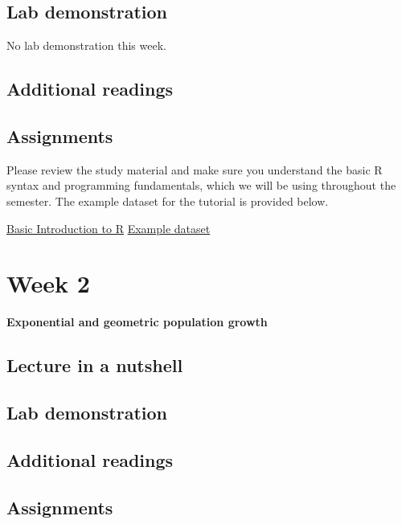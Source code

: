 \documentclass[
]{book}
\begin{document}
\hypertarget{lab-demonstration}{%
\section*{Lab demonstration}\label{lab-demonstration}}

No lab demonstration this week.

\hypertarget{additional-readings}{%
\section*{Additional readings}\label{additional-readings}}

\hypertarget{assignments}{%
\section*{Assignments}\label{assignments}}

Please review the study material and make sure you understand the basic R syntax and programming fundamentals, which we will be using throughout the semester. The example dataset for the tutorial is provided below.

\href{./Assignments/Week1_Basic\%20Introduction\%20to\%20R.pdf}{Basic Introduction to R}
\href{./Assignments/example_dat.txt}{Example dataset}

\hypertarget{week-2}{%
\chapter*{Week 2}\label{week-2}}

\textbf{Exponential and geometric population growth}

\hypertarget{lecture-in-a-nutshell-1}{%
\section*{Lecture in a nutshell}\label{lecture-in-a-nutshell-1}}

\hypertarget{lab-demonstration-1}{%
\section*{Lab demonstration}\label{lab-demonstration-1}}

\hypertarget{additional-readings-1}{%
\section*{Additional readings}\label{additional-readings-1}}

\hypertarget{assignments-1}{%
\section*{Assignments}\label{assignments-1}}

  
\end{document}
